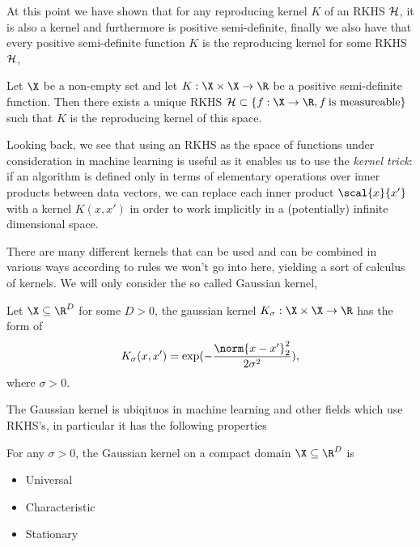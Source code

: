 At this point we have shown that for any reproducing kernel \(K\) of an RKHS
\(\mathcal{H}\), it is also a kernel and furthermore is positive semi-definite,
finally we also have that every positive semi-definite function \(K\) is the
reproducing kernel for some RKHS \(\mathcal{H}\),
\begin{theorem}
\label{thm:moore-aronszajn-pos-def-function-is-rep-kernel} Let \(\X\) be a
non-empty set and let \(K: \X \times \X \to \R\) be a positive semi-definite
function. Then there exists a unique RKHS \(\rkhs{H} \subset \{f : \X \to \R, f
\: \textrm{is measureable}\}\) such that \(K\) is the reproducing kernel of this
space.
\end{theorem}

Looking back, we see that using an RKHS as the space of functions under
consideration in machine learning is useful as it enables us to use the
\emph{kernel trick}: if an algorithm is defined only in terms of elementary
operations over inner products between data vectors, we can replace each inner
product \(\scal{x}{x'}\) with a kernel \(K(x, x')\) in order to work implicitly
in a (potentially) infinite dimensional space.

There are many different kernels that can be used and can be combined in various
ways according to rules we won't go into here, yielding a sort of calculus of
kernels. We will only consider the so called Gaussian kernel,
\begin{definition}
  \label{def:gaussian-kernel} Let \(\X \subseteq \R^D\) for some \(D > 0\), the
gaussian kernel \(K_{\sigma} : \X \times \X \to \R\) has the form of
  \begin{equation}
    \label{eq:gaussian-kernel} K_{\sigma}(x, x') = \exp(-\frac{\norm{x -
x'}_2^2}{2\sigma^2}),
  \end{equation} where \(\sigma > 0\).
\end{definition}

The Gaussian kernel is ubiqituos in machine learning and other fields which use
RKHS's, in particular it has the following properties
\begin{theorem}
  \label{th:gaussian-kernel-properties} For any \(\sigma > 0\), the Gaussian
  kernel on a compact domain \(\X \subseteq \R^D\) is
  \begin{itemize}
  \item Universal
  \item Characteristic
  \item Stationary
  \end{itemize}
\end{theorem}

